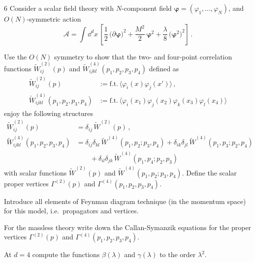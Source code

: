 \begin{hwproblem}{6}\label{hw:6}
Consider a scalar field theory with $N$-component field
$\bm{\varphi}=(\varphi_1,\dots,\varphi_N)$, and $O(N)$-symmetric action
\[
\mathcal A=\int \dd^dx\,\left[\frac12\,\bigl(\partial\bm{\varphi}\bigr)^2+\frac{M^2}2\,\bm{\varphi}^2+\frac\lambda8\,\bigl(\bm{\varphi}^2\bigr)^2\right]\,.
\]
\begin{hwparts}
\item Use the $O(N)$ symmetry to show that the two- and four-point correlation
functions $\tilde W^{(2)}_{ij}(p)$ and $\tilde W^{(4)}_{ijkl}(p_1,p_2,p_3,p_4)$
defined as
\begin{align*}
\tilde W^{(2)}_{ij}(p)&:=\text{f.t.}\,\bigl\langle\varphi_i(x)\varphi_j(x')\bigr\rangle\,,\\
\tilde W^{(4)}_{ijkl}(p_1,p_2,p_3,p_4)&:=\text{f.t.}\,\bigl\langle\varphi_i(x_1)\varphi_j(x_2)\varphi_k(x_3)\varphi_l(x_4)\bigr\rangle
\end{align*}
enjoy the following structures
\begin{align*}
\tilde W^{(2)}_{ij}(p)&=\delta_{ij}\,\tilde W^{(2)}(p)\,,\\
\tilde W^{(4)}_{ijkl}(p_1,p_2,p_3,p_4)&=\delta_{ij}\delta_{kl}\,\tilde W^{(4)}(p_1,p_2;p_3,p_4)+\delta_{ik}\delta_{jl}\,\tilde W^{(4)}(p_1,p_3;p_2,p_4)\\
&\qquad+\delta_{il}\delta_{jk}\,\tilde W^{(4)}(p_1,p_4;p_2,p_3)
\end{align*}
with scalar functions $\tilde W^{(2)}(p)$ and $\tilde W^{(4)}(p_1,p_2;p_3,p_4)$.
Define the scalar proper vertices $\Gamma^{(2)}(p)$ and
$\Gamma^{(4)}(p_1,p_2,p_3,p_4)$.
\item Introduce all elements of Feynman diagram technique (in the momentum space)
for this model, i.e.\ propagators and vertices.
\item For the massless theory write down the Callan-Symanzik equations for the
proper vertices $\Gamma^{(2)}(p)$ and $\Gamma^{(4)}(p_1,p_2,p_3,p_4)$.
\item At $d=4$ compute the functions $\beta(\lambda)$ and $\gamma(\lambda)$ to the
order $\lambda^2$.
\end{hwparts}
\end{hwproblem}
